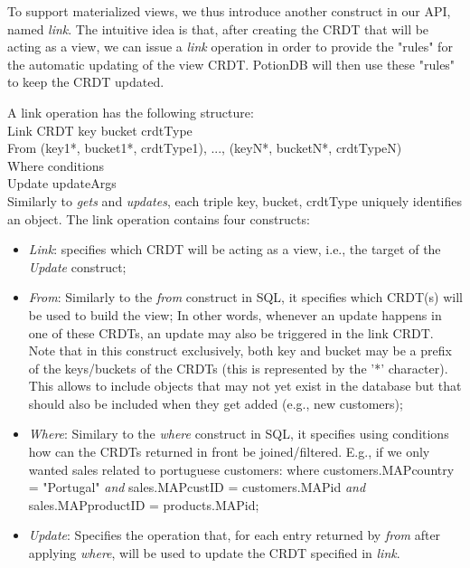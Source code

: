 \documentclass{vldb}
\begin{document}
To support materialized views, we thus introduce another construct in our API, named \emph{link}.
The intuitive idea is that, after creating the CRDT that will be acting as a view, we can issue a \emph{link} operation in order to provide the "rules" for the automatic updating of the view CRDT.
PotionDB will then use these "rules" to keep the CRDT updated.

A link operation has the following structure:
\\

Link CRDT key bucket crdtType \\
From (key1*, bucket1*, crdtType1), ..., (keyN*, bucketN*, crdtTypeN) \\
Where conditions \\
Update updateArgs \\


Similarly to \emph{gets} and \emph{updates}, each triple key, bucket, crdtType uniquely identifies an object.
The link operation contains four constructs:

\begin{itemize}
	\item \emph{Link}: specifies which CRDT will be acting as a view, i.e., the target of the \emph{Update} construct;
	\item \emph{From}: Similarly to the \emph{from} construct in SQL, it specifies which CRDT(s) will be used to build the view;
	In other words, whenever an update happens in one of these CRDTs, an update may also be triggered in the link CRDT.
	Note that in this construct exclusively, both key and bucket may be a prefix of the keys/buckets of the CRDTs (this is represented by the '*' character).
	This allows to include objects that may not yet exist in the database but that should also be included when they get added (e.g., new customers);
	\item \emph{Where}: Similary to the \emph{where} construct in SQL, it specifies using conditions how can the CRDTs returned in front be joined/filtered. E.g., if we only wanted sales related to portuguese customers: where customers.MAP{country} = "Portugal" \emph{and} sales.MAP{custID} = customers.MAP{id} \emph{and} sales.MAP{productID} = products.MAP{id};
	\item \emph{Update}: Specifies the operation that, for each entry returned by \emph{from} after applying \emph{where}, will be used to update the CRDT specified in \emph{link}.
\end{itemize}
\end{document}
